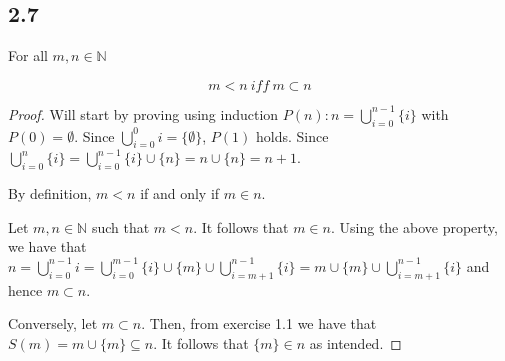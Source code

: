 \subsection*{2.7} For all $m, n \in \mathbb{N}$

$$m < n~iff~m \subset n$$

\begin{proof}

Will start by proving using induction $P(n): n = \bigcup_{i=0}^{n-1} \{i\}$ with $P(0) = \emptyset$. Since $\bigcup_{i=0}^{0} i = \{\emptyset\}$, $P(1)$ holds.
Since $\bigcup_{i=0}^{n} \{i\} = \bigcup_{i=0}^{n-1} \{i\} \cup \{n\} = n \cup \{n\} = n+1$.

By definition, $m < n$ if and only if $m \in n$. 

Let $m, n \in \mathbb{N}$ such that $m < n$. It follows that $m \in n$. Using the above property, we have that $n = \bigcup_{i=0}^{n-1} i = \bigcup_{i=0}^{m-1} \{i\} \cup \{m\} \cup \bigcup_{i=m+1}^{n-1} \{i\} = m \cup \{m\} \cup \bigcup_{i=m+1}^{n-1} \{i\}$ and hence $m \subset n$.

Conversely, let $m \subset n$. Then, from exercise 1.1 we have that $S(m) = m \cup \{m\} \subseteq n$. It follows that $\{m\} \in n$ as intended.
\end{proof}

